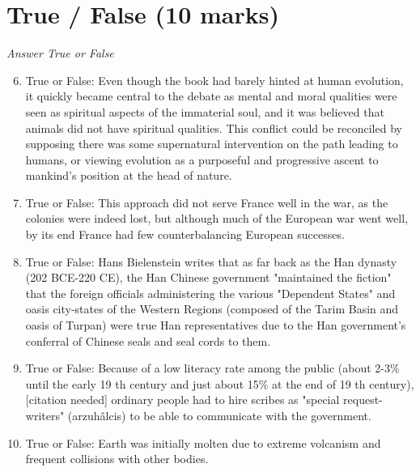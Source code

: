 \documentclass[12pt]{article}
\begin{document}
\section*{True / False (10 marks)}
\textit{Answer True or False}
\begin{enumerate}[label=\arabic*.]
\setcounter{enumi}{5}
\item True or False: Even though the book had barely hinted at human evolution, it quickly became central to the debate as mental and moral qualities were seen as spiritual aspects of the immaterial soul, and it was believed that animals did not have spiritual qualities. This conflict could be reconciled by supposing there was some supernatural intervention on the path leading to humans, or viewing evolution as a purposeful and progressive ascent to mankind's position at the head of nature.
\item True or False: This approach did not serve France well in the war, as the colonies were indeed lost, but although much of the European war went well, by its end France had few counterbalancing European successes.
\item True or False: Hans Bielenstein writes that as far back as the Han dynasty (202 BCE-220 CE), the Han Chinese government "maintained the fiction" that the foreign officials administering the various "Dependent States" and oasis city-states of the Western Regions (composed of the Tarim Basin and oasis of Turpan) were true Han representatives due to the Han government's conferral of Chinese seals and seal cords to them.
\item True or False: Because of a low literacy rate among the public (about 2-3\% until the early 19 th century and just about 15\% at the end of 19 th century),[citation needed] ordinary people had to hire scribes as "special request-writers" (arzuhâlcis) to be able to communicate with the government.
\item True or False: Earth was initially molten due to extreme volcanism and frequent collisions with other bodies.
\end{enumerate}
\end{document}
